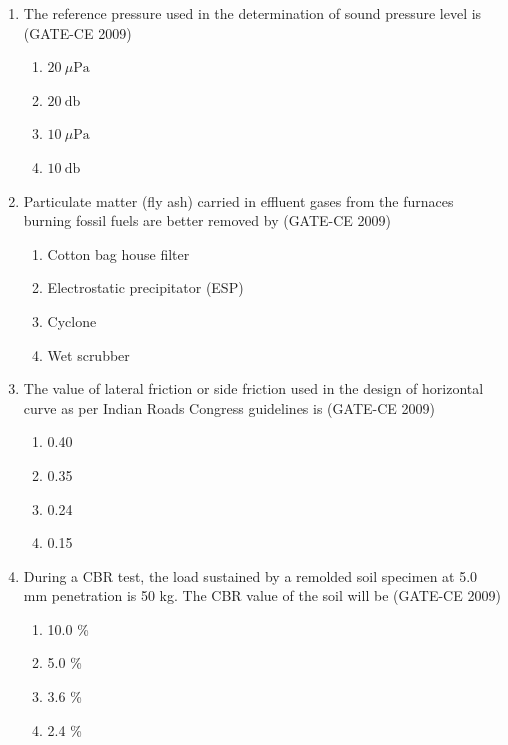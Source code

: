 \documentclass[journal,12pt,onecolumn]{article}
\theoremstyle{remark}
\begin{document}
\begin{enumerate}
    \item The reference pressure used in the determination of sound pressure level is (GATE-CE 2009)
    \begin{multicols}{2}
    \begin{enumerate}
        \item $20~\mu\mathrm{Pa}$
        \item $20~\mathrm{db}$
        \item $10~\mu\mathrm{Pa}$
        \item $10~\mathrm{db}$
    \end{enumerate}
    \end{multicols}
    
    \item Particulate matter (fly ash) carried in effluent gases from the furnaces burning fossil fuels are better removed by (GATE-CE 2009)
    \begin{enumerate}
        \item Cotton bag house filter 
        \item Electrostatic precipitator (ESP)
        \item Cyclone 
        \item Wet scrubber
    \end{enumerate}
    
    \item The value of lateral friction or side friction used in the design of horizontal curve as per Indian Roads Congress guidelines is (GATE-CE 2009)
    \begin{multicols}{4}
    \begin{enumerate}
        \item 0.40 
        \item 0.35 
        \item 0.24 
        \item 0.15
    \end{enumerate}
    \end{multicols}
    
    \item During a CBR test, the load sustained by a remolded soil specimen at 5.0 mm penetration is 50 kg. The CBR value of the soil will be (GATE-CE 2009)
    \begin{multicols}{2}
    \begin{enumerate}
        \item 10.0 \% 
        \item 5.0 \% 
        \item 3.6 \% 
        \item 2.4 \%
    \end{enumerate}
    \end{multicols}
    

\end{enumerate}
\end{document}
